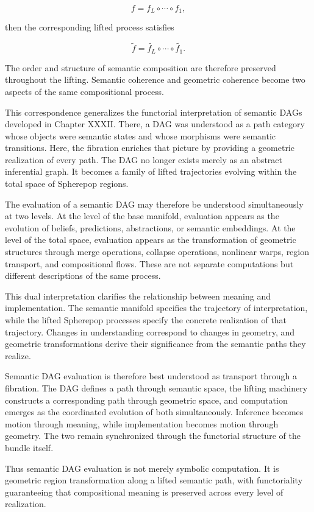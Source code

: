 \documentclass[12pt,letterpaper]{article}
\theoremstyle{remark}
\begin{document}
\[
f = f_L \circ \cdots \circ f_1,
\]

then the corresponding lifted process satisfies

\[
\widetilde{f} =
\widetilde{f_L}
\circ
\cdots
\circ
\widetilde{f_1}.
\]

The order and structure of semantic composition are therefore preserved throughout the lifting. Semantic coherence and geometric coherence become two aspects of the same compositional process.

This correspondence generalizes the functorial interpretation of semantic DAGs developed in Chapter XXXII. There, a DAG was understood as a path category whose objects were semantic states and whose morphisms were semantic transitions. Here, the fibration enriches that picture by providing a geometric realization of every path. The DAG no longer exists merely as an abstract inferential graph. It becomes a family of lifted trajectories evolving within the total space of Spherepop regions.

The evaluation of a semantic DAG may therefore be understood simultaneously at two levels. At the level of the base manifold, evaluation appears as the evolution of beliefs, predictions, abstractions, or semantic embeddings. At the level of the total space, evaluation appears as the transformation of geometric structures through merge operations, collapse operations, nonlinear warps, region transport, and compositional flows. These are not separate computations but different descriptions of the same process.

This dual interpretation clarifies the relationship between meaning and implementation. The semantic manifold specifies the trajectory of interpretation, while the lifted Spherepop processes specify the concrete realization of that trajectory. Changes in understanding correspond to changes in geometry, and geometric transformations derive their significance from the semantic paths they realize.

Semantic DAG evaluation is therefore best understood as transport through a fibration. The DAG defines a path through semantic space, the lifting machinery constructs a corresponding path through geometric space, and computation emerges as the coordinated evolution of both simultaneously. Inference becomes motion through meaning, while implementation becomes motion through geometry. The two remain synchronized through the functorial structure of the bundle itself.

Thus semantic DAG evaluation is not merely symbolic computation. It is geometric region transformation along a lifted semantic path, with functoriality guaranteeing that compositional meaning is preserved across every level of realization.
\end{document}

